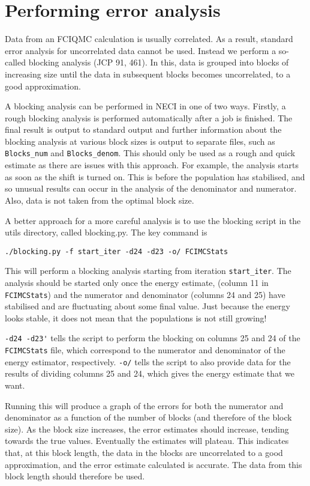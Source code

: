 \documentclass[a4paper,notitlepage,dvipsnames]{scrreprt}
\let\code\lstinline
\begin{document}
\section{Performing error analysis}
    Data from an FCIQMC calculation is usually correlated. As a result,
    standard error analysis for uncorrelated data cannot be used. Instead we
    perform a so-called blocking analysis (JCP 91, 461). In this, data is
    grouped into blocks of increasing size until the data in subsequent blocks
    becomes uncorrelated, to a good approximation.

    A blocking analysis can be performed in NECI in one of two ways. Firstly,
    a rough blocking analysis is performed automatically after a job is finished.
    The final result is output to standard output and further information about
    the blocking analysis at various block sizes is output to separate files,
	such as \code{Blocks_num} and \code{Blocks_denom}. This should only be
	used as a rough
    and quick estimate as there are issues with this approach. For example, the
    analysis starts as soon as the shift is turned on. This is before the
    population has stabilised, and so unusual results can occur in the analysis
    of the denominator and numerator. Also, data is not taken from the optimal
    block size.

    A better approach for a more careful analysis is to use the blocking script
    in the utils directory, called blocking.py. The key command is
	\begin{lstlisting}[gobble=4]
		./blocking.py -f start_iter -d24 -d23 -o/ FCIMCStats
    \end{lstlisting}

	This will perform a blocking analysis starting from iteration
	\code{start_iter}.
    The analysis should be started only once the energy estimate, (column 11 in
	\code{FCIMCStats}) and the numerator and denominator (columns 24 and
	25) have
    stabilised and are fluctuating about some final value. Just because the
    energy looks stable, it does not mean that the populations is not still
    growing!

	\code{-d24 -d23'} tells the script to perform the blocking on columns 25 and
	24 of the \code{FCIMCStats} file, which correspond to the numerator and
	denominator of the energy estimator, respectively. \code{-o/} tells the script
    to also provide data for the results of dividing columns 25 and 24, which
    gives the energy estimate that we want.

    Running this will produce a graph of the errors for both the numerator and
    denominator as a function of the number of blocks (and therefore of the
    block size). As the block size increases, the error estimates should
    increase, tending towards the true values. Eventually the estimates will
    plateau. This indicates that, at this block length, the data in the blocks
    are uncorrelated to a good approximation, and the error estimate calculated
    is accurate. The data from this block length should therefore be used.
\end{document}
